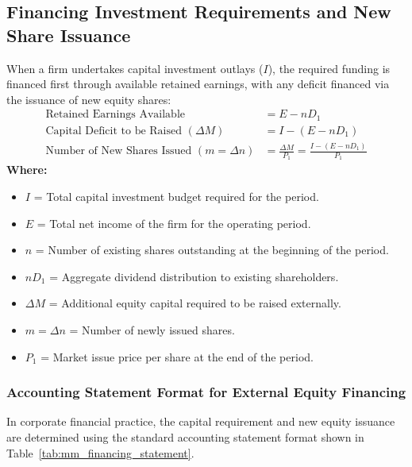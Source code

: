 \subsection{Financing Investment Requirements and New Share Issuance}
When a firm undertakes capital investment outlays ($I$), the required funding is financed first through available retained earnings, with any deficit financed via the issuance of new equity shares:
\begin{align}
    \text{Retained Earnings Available} &= E - n D_1 \label{eq:mm_retained} \\[4pt]
    \text{Capital Deficit to be Raised } (\Delta M) &= I - (E - n D_1) \label{eq:mm_deficit} \\[4pt]
    \text{Number of New Shares Issued } (m = \Delta n) &= \frac{\Delta M}{P_1} = \frac{I - (E - n D_1)}{P_1} \label{eq:mm_new_shares}
\end{align}
\textbf{Where:}
\begin{itemize}[noitemsep, topsep=2pt]
    \item $I$ = Total capital investment budget required for the period.
    \item $E$ = Total net income of the firm for the operating period.
    \item $n$ = Number of existing shares outstanding at the beginning of the period.
    \item $n D_1$ = Aggregate dividend distribution to existing shareholders.
    \item $\Delta M$ = Additional equity capital required to be raised externally.
    \item $m = \Delta n$ = Number of newly issued shares.
    \item $P_1$ = Market issue price per share at the end of the period.
\end{itemize}

\subsubsection{Accounting Statement Format for External Equity Financing}
In corporate financial practice, the capital requirement and new equity issuance are determined using the standard accounting statement format shown in Table~\ref{tab:mm_financing_statement}.

